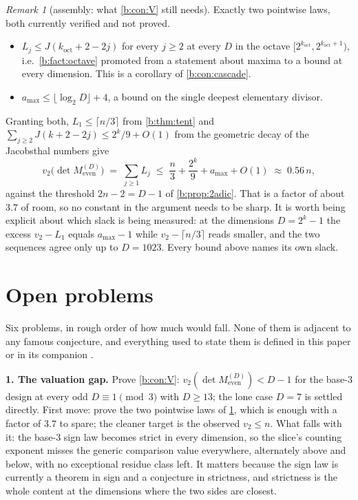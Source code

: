 \documentclass[11pt]{amsart}
\theoremstyle{definition}
\theoremstyle{remark}
\newtheorem{remark}[theorem]{Remark}
\begin{document}
\begin{remark}[assembly: what \cref{b:con:V} still needs]
\label{b:rem:assembly}
Exactly two pointwise laws, both currently verified and not proved.
\begin{itemize}
  \item $L_j \le J(k_{\mathrm{oct}} + 2 - 2j)$ for every $j \ge 2$ at every $D$ in the octave $[2^{k_{\mathrm{oct}}}, 2^{k_{\mathrm{oct}}+1})$, i.e.\ \cref{b:fact:octave} promoted from a statement about maxima to a bound at every dimension. This is a corollary of \cref{b:con:cascade}.
  \item $a_{\max} \le \lfloor \log_2 D \rfloor + 4$, a bound on the single deepest elementary divisor.
\end{itemize}
Granting both, $L_1 \le \lceil n/3 \rceil$ from \cref{b:thm:tent} and $\sum_{j \ge 2} J(k+2-2j) \le 2^{k}/9 + O(1)$ from the geometric decay of the Jacobsthal numbers give
\[
  v_2\bigl(\det M_{\mathrm{even}}^{(D)}\bigr) \;=\; \sum_{j \ge 1} L_j \;\le\; \frac{n}{3} + \frac{2^{k}}{9} + a_{\max} + O(1) \;\approx\; 0.56\,n,
\]
against the threshold $2n-2 = D-1$ of \cref{b:prop:2adic}. That is a factor of about $3.7$ of room, so no constant in the argument needs to be sharp. It is worth being explicit about which slack is being measured: at the dimensions $D = 2^k - 1$ the excess $v_2 - L_1$ equals $a_{\max}-1$ while $v_2 - \lceil n/3 \rceil$ reads smaller, and the two sequences agree only up to $D = 1023$. Every bound above names its own slack.
\end{remark}


\section{Open problems}
\label{b:sec:open}

Six problems, in rough order of how much would fall. None of them is adjacent to any famous conjecture, and everything used to state them is defined in this paper or in its companion \cite{slice-order}.

\textbf{1. The valuation gap.} Prove \cref{b:con:V}: $v_2(\det M_{\mathrm{even}}^{(D)}) < D-1$ for the base-$3$ design at every odd $D \equiv 1 \pmod 3$ with $D \ge 13$; the lone case $D = 7$ is settled directly. First move: prove the two pointwise laws of \cref{b:rem:assembly}, which is enough with a factor of $3.7$ to spare; the cleaner target is the observed $v_2 \le n$. What falls with it: the base-$3$ sign law becomes strict in every dimension, so the slice's counting exponent misses the generic comparison value everywhere, alternately above and below, with no exceptional residue class left. It matters because the sign law is currently a theorem in sign and a conjecture in strictness, and strictness is the whole content at the dimensions where the two sides are closest.
\end{document}
